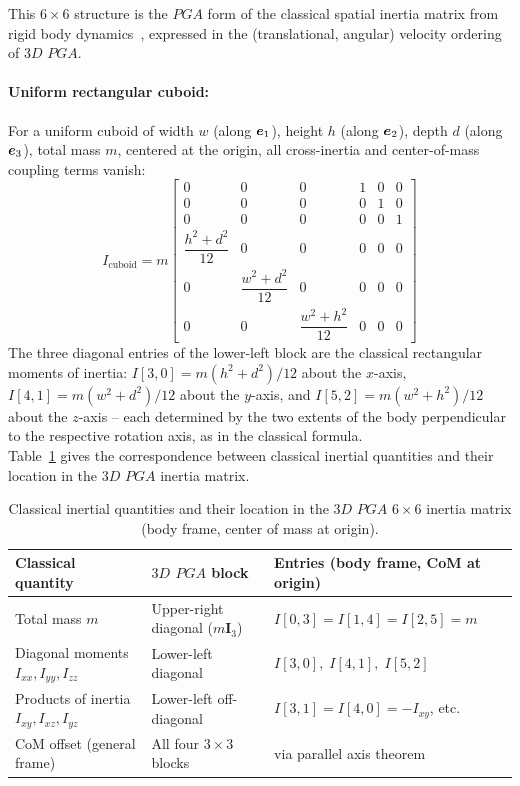 This $6\times6$ structure is the $PGA$ form of the classical spatial inertia matrix from
rigid body dynamics~\cite{Dynamics_in_PGA_plane-based_Dorst-DeKennik:2023}, expressed in
the (translational, angular) velocity ordering of $3D$ $PGA$.

\paragraph{Uniform rectangular cuboid:} For a uniform cuboid of width $w$ (along $\bm{e}_{1}$),
height $h$ (along $\bm{e}_{2}$), depth $d$ (along $\bm{e}_{3}$), total mass $m$, centered at the
origin, all cross-inertia and center-of-mass coupling terms vanish:
\begin{equation}
    I_\mathrm{cuboid} = m
    \begin{bmatrix}
        0 & 0 & 0 & 1 & 0 & 0 \\[4pt]
        0 & 0 & 0 & 0 & 1 & 0 \\[4pt]
        0 & 0 & 0 & 0 & 0 & 1 \\[4pt]
        \dfrac{h^2+d^2}{12} & 0 & 0 & 0 & 0 & 0 \\[10pt]
        0 & \dfrac{w^2+d^2}{12} & 0 & 0 & 0 & 0 \\[10pt]
        0 & 0 & \dfrac{w^2+h^2}{12} & 0 & 0 & 0
    \end{bmatrix}
    \label{eq:inertia_cuboid}
\end{equation}
The three diagonal entries of the lower-left block are the classical rectangular moments
of inertia: $I[3,0] = m(h^2+d^2)/12$ about the $x$-axis, $I[4,1] = m(w^2+d^2)/12$ about
the $y$-axis, and $I[5,2] = m(w^2+h^2)/12$ about the $z$-axis -- each determined by the
two extents of the body perpendicular to the respective rotation axis, as in the classical
formula. \\

Table~\ref{tab:classical_pga3dp} gives the correspondence between classical inertial
quantities and their location in the $3D$ $PGA$ inertia matrix.

\begin{table}[h!]
\centering\small
\begin{tabular}{p{3.1cm}|p{4.6cm}|p{4.7cm}}
\hline
Classical quantity & $3D$ $PGA$ block & Entries (body frame, CoM at origin) \\
\hline
Total mass $m$ & Upper-right diagonal ($m\mathbf{I}_3$) & $I[0,3]=I[1,4]=I[2,5]=m$ \\
Diagonal moments $I_{xx}, I_{yy}, I_{zz}$ & Lower-left diagonal & $I[3,0],\; I[4,1],\;
I[5,2]$ \\
Products of inertia $I_{xy}, I_{xz}, I_{yz}$ & Lower-left off-diagonal &
$I[3,1]=I[4,0]=-I_{xy}$, etc. \\
CoM offset (general frame) & All four $3\times3$ blocks & via parallel axis theorem \\
\hline
\end{tabular}
\caption{Classical inertial quantities and their location in the $3D$ $PGA$ $6\times6$
inertia matrix (body frame, center of mass at origin).}
\label{tab:classical_pga3dp}
\end{table}

